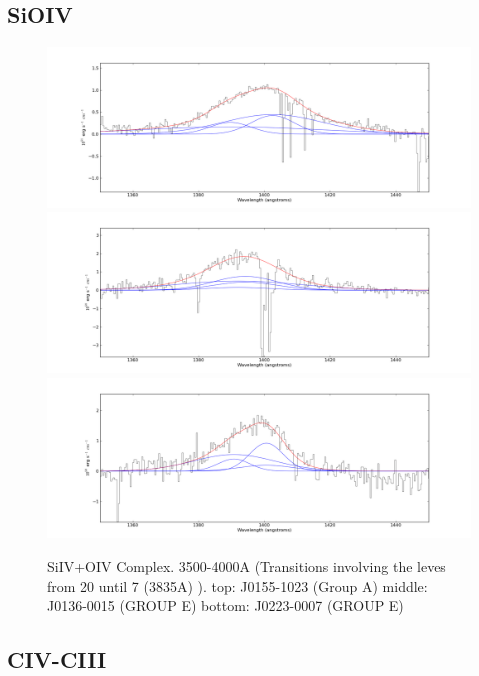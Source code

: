 \documentclass[usenatbib]{mn2e}
\begin{document}
\newpage

\subsection{SiOIV}




\begin{figure}
\begin{center}
\includegraphics[width=0.46\linewidth,angle=0]{SiIV_1.png}
\vspace{5mm}
\includegraphics[width=0.49\linewidth,angle=0]{SiIV_17.png}\\
\includegraphics[width=0.46\linewidth,angle=0]{SiIV_20.png}
\end{center} 
\caption{SiIV+OIV Complex. 3500-4000A (Transitions involving  the leves from 20 until 7 (3835A) ).   top: J0155-1023 (Group A) middle: J0136-0015 (GROUP E) bottom: J0223-0007 (GROUP E) \label{fig:landscape}}   
\end{figure}

\newpage







\subsection{CIV-CIII}
\end{document}
